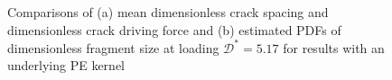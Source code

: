 \begin{figure}[htb!]
\begin{subfigure}[b]{0.475\textwidth}
    \caption{}
  \end{subfigure}
  \caption{Comparisons of (a) mean dimensionless crack spacing and dimensionless crack driving force and (b) estimated PDFs of dimensionless fragment size at loading $\mathcal{D}^* = 5.17$ for results with an underlying PE kernel}
  \label{fig: Chapter4/2D/statistics_sensitivity_exp}
\end{figure}
